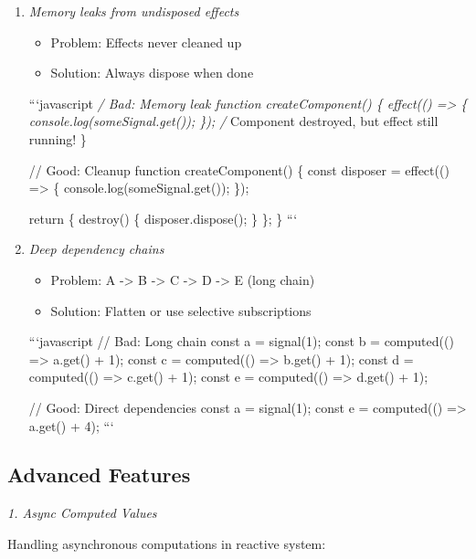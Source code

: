 \documentclass[11pt]{article}
\begin{document}
\begin{enumerate}
\item \emph{Memory leaks from undisposed effects}
\begin{itemize}
\item Problem: Effects never cleaned up
\item Solution: Always dispose when done
\end{itemize}

```javascript
\emph{/ Bad: Memory leak
function createComponent() \{
  effect(() => \{
    console.log(someSignal.get());
  \});
  /} Component destroyed, but effect still running!
\}

// Good: Cleanup
function createComponent() \{
  const disposer = effect(() => \{
    console.log(someSignal.get());
  \});

  return \{
    destroy() \{
      disposer.dispose();
    \}
  \};
\}
```

\item \emph{Deep dependency chains}
\begin{itemize}
\item Problem: A -> B -> C -> D -> E (long chain)
\item Solution: Flatten or use selective subscriptions
\end{itemize}

```javascript
// Bad: Long chain
const a = signal(1);
const b = computed(() => a.get() + 1);
const c = computed(() => b.get() + 1);
const d = computed(() => c.get() + 1);
const e = computed(() => d.get() + 1);

// Good: Direct dependencies
const a = signal(1);
const e = computed(() => a.get() + 4);
```
\end{enumerate}
\subsection{Advanced Features}
\label{sec:orgffd788c}

\emph{1. Async Computed Values}

Handling asynchronous computations in reactive system:
\end{document}

